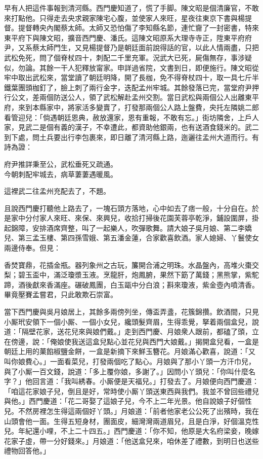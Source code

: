 早有人把這件事報到清河縣。西門慶知道了，慌了手脚。陳文昭是個清廉官，不敢來打點他。只得走去央求親家陳宅心腹，並使家人來旺，{}星夜往東京下書與楊提督。提督轉央內閣蔡太師。太師又恐怕傷了李知縣名節，{}連忙齎了一封密書，特來東平府下與陳文昭，擴音西門慶、潘氏。這陳文昭原系大理寺寺正，陞東平府府尹，又系蔡太師門生，又見楊提督乃是朝廷面前說得話的官，以此人情兩盡，只把武松免死，問了個脊杖四十，刺配二千里充軍。況武大已死，屍傷無存，事涉疑似，勿論。其餘一干人犯釋放甯家。申詳過省院，文書到日，即便施行。陳文昭從牢中取出武松來，當堂讀了朝廷明降，開了長枷，免不得脊杖四十，取一具七斤半鐵葉團頭枷釘了，臉上刺了兩行金字，迭配孟州牢城。其餘發落已完，當堂府尹押行公文，差兩個防送公人，領了武松解赴孟州交割。當日武松與兩個公人出離東平府，來到本縣家中，將家活多變賣了，打發那兩個公人路上盤費，央托左隣姚二郎看管迎兒：「倘遇朝廷恩典，赦放還家，恩有重報，不敢有忘。」街坊隣舍，上戶人家，見武二是個有義的漢子，不幸遭此，都資助他銀兩，也有送酒食錢米的。武二到下處，問土兵要出行李包裹來，即日離了清河縣上路，迤邐往孟州大道而行。有詩為證：

\begin{myquote}
府尹推詳秉至公，武松垂死又疏通。\\今朝刺配牢城去，病草萋萋遇暖風。
\end{myquote}

這裡武二往孟州充配去了，不題。

且說西門慶打聽他上路去了，一塊石頭方落地，心中如去了痞一般，十分自在。於是家中分付家人來旺、來保、來興兒，收拾打掃後花園芙蓉亭乾淨，鋪設圍屏，掛起錦障，安排酒席齊整，叫了一起樂人，吹彈歌舞。請大娘子吳月娘、第二李嬌兒、第三孟玉樓、第四孫雪娥、第五潘金蓮，合家歡喜飲酒。家人媳婦、丫鬟使女兩邊侍奉。但見：

\begin{myquote}
香焚寶鼎，花插金瓶。器列象州之古玩，簾開合浦之明珠。水晶盤內，高堆火棗交梨；碧玉盃中，滿泛瓊漿玉液。烹龍肝，炮鳳腑，果然下筯了萬錢；黑熊掌，紫駝蹄，酒後獻來香滿座。碾破鳳團，白玉甌中分白浪；斟來瓊液，紫金壺內噴清香。畢竟壓賽孟嘗君，只此敢欺石崇富。
\end{myquote}

當下西門慶與吳月娘居上，其餘多兩傍列坐，傳盃弄盞，花簇錦攢。飲酒間，只見小厮玳安領下一個小厮、一個小女兒，纔頭髮齊眉，生得乖覺，拏着兩個盒兒，說道：「隔壁花家，送花兒來與娘們戴。」走到西門慶、月娘衆人跟前，都磕了頭，立在傍邊，說：「俺娘使我送這盒兒點心並花兒與西門大娘戴。」揭開盒兒看，一盒是朝廷上用的菓餡椒鹽金餅，一盒是新摘下來鮮玉簪花。月娘滿心歡喜，說道：「又叫你娘費心。」一面看菜兒，打發兩個吃了點心。月娘與了那小丫頭一方汗巾兒，與了小厮一百文錢，說道：「多上覆你娘，多謝了。」因問小丫頭兒：「你叫什麼名字？」他回言道：「我叫綉春。小厮便是天福兒。」打發去了。月娘便向西門慶道：「咱這花家娘子兒，倒且是好，常時使小厮丫頭送東西與我們。我並不曾回些禮兒與他。」西門慶道：「花二哥娶了這娘子兒，今不上二年光景。他自說娘子好個性兒。不然房裡怎生得這兩個好丫頭。」{}{}月娘道：「前者他家老公公死了出殯時，我在山頭會他一面。生得五短身材，團面皮，細灣灣兩道眉兒，且是白淨，好個溫克性兒。年紀還小哩，不上二十四五。」西門慶道：「你不知，他原是大名府梁妾，晚嫁花家子虛，帶一分好錢來。」月娘道：「他送盒兒來，咱休差了禮數，到明日也送些禮物回答他。」

